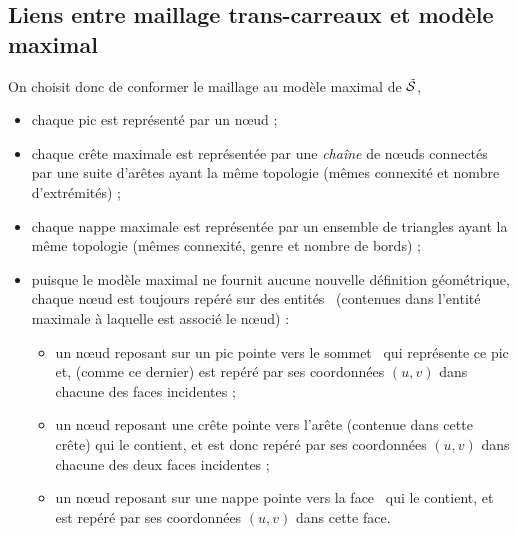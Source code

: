\subsection{Liens entre maillage trans-carreaux et modèle maximal}
On choisit donc de conformer le maillage au modèle maximal de $\tilde{\mathcal{S}}$, \ie
    \begin{itemize}
        \item chaque pic est représenté par un n\oe ud ;
        \item chaque crête maximale est représentée par une \textit{chaîne} de n\oe uds connectés par une suite d'arêtes ayant la même topologie (\ie mêmes connexité et nombre d'extrémités) ;
        \item chaque nappe maximale est représentée par un ensemble de triangles ayant la même topologie (\ie mêmes connexité, genre et nombre de bords) ;
        \item puisque le modèle maximal ne fournit aucune nouvelle définition géométrique, chaque n\oe ud est toujours repéré sur des entités \brep\ (contenues dans l'entité maximale à laquelle est associé le n\oe ud) :
        \begin{itemize}
            \item un n\oe ud reposant sur un pic pointe vers le sommet \brep\ qui représente ce pic et, (comme ce dernier) est repéré par ses coordonnées $(u,v)$ dans chacune des faces incidentes ;%
            \item un n\oe ud reposant une crête pointe vers l'arête (contenue dans cette crête) qui le contient, et est donc repéré par ses coordonnées $(u,v)$ dans chacune des deux faces incidentes ;
            \item un n\oe ud reposant sur une nappe pointe vers la face \brep\ qui le contient, et est repéré par ses coordonnées $(u,v)$ dans cette face.
        \end{itemize}
    \end{itemize}


